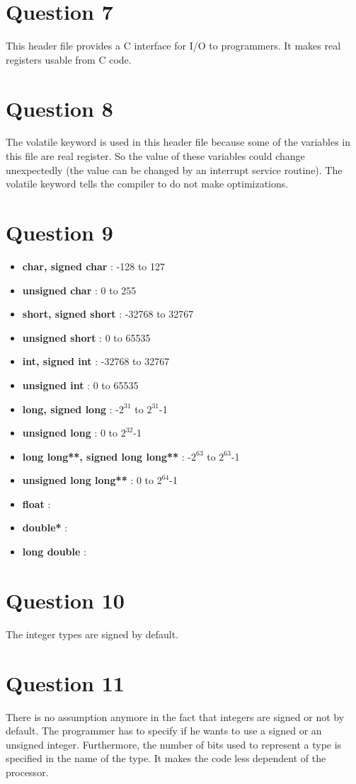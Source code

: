 \documentclass[a4paper,10pt]{article}
\begin{document}
\section*{Question 7}
This header file provides a C interface for I/O to programmers. It makes real registers usable from C code.

\section*{Question 8}
The volatile keyword is used in this header file because some of the variables in this file are real register. So the value of these variables could change unexpectedly (the value can be changed by an interrupt service routine). The volatile keyword tells the compiler to do not make optimizations.

\section*{Question 9}
\begin{itemize}
 \item \textbf{char, signed char} : -128 to 127
 \item \textbf{unsigned char} : 0 to 255
 \item \textbf{short, signed short} : -32768 to 32767
 \item \textbf{unsigned short} : 0 to 65535
 \item \textbf{int, signed int} : -32768 to 32767
 \item \textbf{unsigned int} : 0 to 65535
 \item \textbf{long, signed long} : -$2^{31}$ to $2^{31}$-1
 \item \textbf{unsigned long} : 0 to $2^{32}$-1
 \item \textbf{long long**, signed long long**} : -$2^{63}$ to $2^{63}$-1
 \item \textbf{unsigned long long**} : 0 to $2^{64}$-1
 \item \textbf{float} :
 \item \textbf{double*} :
 \item \textbf{long double} :
\end{itemize}

\section*{Question 10}
The integer types are signed by default.

\section*{Question 11}
There is no assumption anymore in the fact that integers are signed or not by default. The programmer has to specify if he wants to use a signed or an unsigned integer. Furthermore, the number of bits used to represent a type is specified in the name of the type. It makes the code less dependent of the processor.
\end{document}
